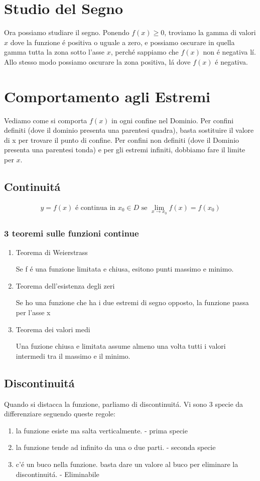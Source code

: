 \documentclass{article}
\begin{document}
\section{Studio del Segno}
Ora possiamo studiare il segno. Ponendo $f(x)\geq 0$, troviamo la gamma di valori $x$ dove la funzione é positiva o uguale a zero, e possiamo oscurare in quella gamma tutta la zona sotto l'asse $x$, perché sappiamo che $f(x)$ non é negativa lí. Allo stesso modo possiamo oscurare la zona positiva, lá dove $f(x)$ é negativa.
\section{Comportamento agli Estremi}
Vediamo come si comporta $f(x)$ in ogni confine nel Dominio. Per confini definiti (dove il dominio presenta una parentesi quadra), basta sostituire il valore di x per trovare il punto di confine. Per confini non definiti (dove il Dominio presenta una parentesi tonda) e per gli estremi infiniti, dobbiamo fare il limite per $x$.

\subsection{Continuitá}
\begin{gather*}
    y=f(x)\text{ é continua in }x_0\in D\text{ se }\lim_{x\to x_0}f(x)=f(x_0)
\end{gather*}

\subsubsection{3 teoremi sulle funzioni continue}

\begin{enumerate}
    \item Teorema di Weierstrass
    
    Se f é una funzione limitata e chiusa, esitono punti massimo e minimo.
    \item Teorema dell'esistenza degli zeri
    
    Se ho una funzione che ha i due estremi di segno opposto, la funzione passa per l'asse x
    \item Teorema dei valori medi
    
    Una fuzione chiusa e limitata assume almeno una volta tutti i valori intermedi tra il massimo e il minimo.
\end{enumerate}
\subsection{Discontinuitá}
Quando si distacca la funzione, parliamo di discontinuitá. Vi sono 3 specie da differenziare seguendo queste regole:
\begin{enumerate}
    \item la funzione esiste ma salta verticalmente. - prima specie
    \item la funzione tende ad infinito da una o due parti. - seconda specie
    \item c'é un buco nella funzione. basta dare un valore al buco per eliminare la discontinuitá. - Eliminabile
\end{enumerate}
\end{document}
